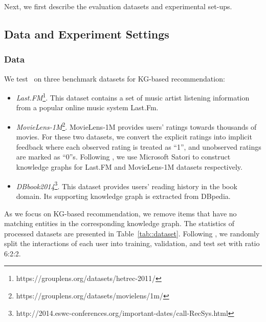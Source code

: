 Next, we first describe the evaluation datasets and experimental set-ups.


\subsection{Data and Experiment Settings}



\subsubsection{Data}
We test \name\ on three benchmark datasets for KG-based recommendation: 
\begin{itemize}[leftmargin=*]
\item \textit{Last.FM}\footnote{https://grouplens.org/datasets/hetrec-2011/}. 
This dataset contains a set of music artist listening information from a popular online music system Last.Fm. 

\item \textit{MovieLens-1M}\footnote{https://grouplens.org/datasets/movielens/1m/}. 
MovieLens-1M provides users' ratings towards thousands of movies. For these two datasets, we convert the explicit ratings into implicit feedback where each observed rating is treated as ``1'', and unobserved ratings are marked as ``0''s. Following \cite{Wang_2019}, we use Microsoft Satori to construct knowledge graphs for Last.FM and MovieLens-1M datasets respectively.
\item \textit{DBbook2014}\footnote{http://2014.eswc-conferences.org/important-dates/call-RecSys.html}. 
This dataset provides users' reading history in the book domain. Its supporting knowledge graph is extracted from DBpedia.
\end{itemize}

As we focus on KG-based recommendation, we remove items that have no matching entities in the corresponding knowledge graph. The statistics of processed datasets are presented in Table~\ref{tab::dataset}. Following \cite{Cao_2019,wang2018ripplenet,Wang2018ExplainableRO}, we randomly split the interactions of each user into training, validation, and test set with ratio 6:2:2.





